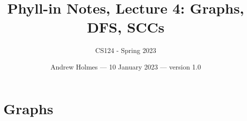 \documentclass{article}
\begin{document}
\title{Phyll-in Notes, Lecture 4: Graphs, DFS, SCCs}
\author{CS124 - Spring 2023}
\date{Andrew Holmes --- 10 January 2023 --- version 1.0}
\maketitle

\tableofcontents



\newpage
\section{Graphs}
\end{document}
